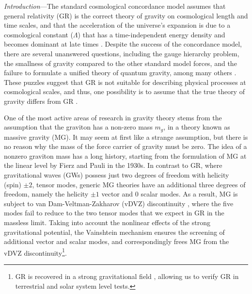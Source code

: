 \documentclass[10pt,prd,twocolumn,aps,nofootinbib,nobibnotes,superscriptaddress,preprintnumbers]{revtex4-2}
\begin{document}
\textit{Introduction}---The standard cosmological concordance model assumes that general relativity (GR) is the correct theory of gravity on cosmological length and time scales, and that the acceleration of the universe's expansion is due to a cosmological constant ($\Lambda$) that has a time-independent energy density and becomes dominant at late times \cite{Dodelson:2020bqr}. 
Despite the success of the concordance model, there are several unanswered questions, including the gauge hierarchy problem, the smallness of gravity compared to the other standard model forces, and the failure to formulate a unified theory of quantum gravity, among many others \cite{Dvali:2013qwe, Moffat:1998vi}. 
These puzzles suggest that GR is not suitable for describing physical processes at cosmological scales, and thus, one possibility is to assume that the true theory of gravity differs from GR \cite{deRham:2023byw}. 

One of the most active areas of research in gravity theory stems from the assumption that the graviton has a non-zero mass $m_g$, in a theory known as massive gravity (MG). It may seem at first like a strange assumption, but there is no reason why the mass of the force carrier of gravity must be zero. The idea of a nonzero graviton mass has a long history, starting from the formulation of MG at the linear level by Fierz and Pauli \cite{Fierz:1939ix} in the 1930s. In contrast to GR, where gravitational waves (GWs) possess just two degrees of freedom with helicity (spin) $\pm 2$, tensor modes, generic MG theories have an additional three degrees of freedom, namely the helicity  $\pm 1$ vector and $0$ scalar modes. As a result, MG is subject to van Dam-Veltman-Zakharov (vDVZ) discontinuity \cite{vanDam:1970vg,Zakharov:1970cc}, where the five modes fail to reduce to the two tensor modes that we expect in GR in the massless limit. Taking into account the nonlinear effects of the strong gravitational potential, the Vainshtein mechanism \cite{Vainshtein:1972sx} ensures the screening of additional vector and scalar modes, and correspondingly frees MG from the vDVZ discontinuity\footnote{GR is recovered in a strong gravitational field \cite{Tasinato:2013rza}, allowing us to verify GR in terrestrial and solar system level tests.}.
\end{document}
